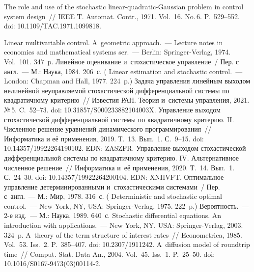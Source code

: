 \begin{multicols}{2}
{\small\frenchspacing
 { %
 \begin{thebibliography}{99}
       The role and use of the stochastic linear-quadratic-Gaussian problem in 
control system design~// IEEE T. Automat. Contr., 1971. Vol.~16. No.\,6. P.~529--552. doi: 
10.1109/TAC.1971.1099818.

 Linear multivariable control. A~geometric approach.~--- Lecture notes in 
economics and mathematical systems ser.~--- Berlin: Springer-Verlag, 1974. Vol.~101. 347~p.
 Линейное оценивание и~сто\-ха\-сти\-че\-ское управ\-ле\-ние~/ Пер. с англ.~--- 
М.: Наука, 1984. 206~с. ( Linear estimation and stochastic control.~--- 
London: Chapman and Hall, 1977. 224~p.)
 Задача управления линейным выходом нелинейной не\-управ\-ля\-емой 
стохастической дифференциальной сис\-те\-мы по квад\-ра\-тич\-но\-му критерию~// Известия 
РАН. Теория и~сис\-те\-мы управ\-ле\-ния, 2021. №\,5. C.~52--73. doi: 
10.31857/S000233882104003X.
 Управ\-ле\-ние выходом стохастической 
дифференциальной сис\-те\-мы по квад\-ра\-тич\-но\-му критерию. II. Численное решение 
уравнений динамического программирования~// Информатика и её применения, 2019. 
Т.~13. Вып.~1. С.~9--15. doi: 10.14357/19922264190102. EDN: ZASZFR.
 Управление выходом стохастической 
дифференциальной сис\-те\-мы по квад\-ра\-тич\-но\-му критерию. IV. Альтернативное численное 
решение~// Информатика и~её применения, 2020. Т.~14. Вып.~1. С.~24--30. doi: 
10.14357/19922264200104. EDN: XNHVFT.
 Оптимальное управление детерминированными 
и~стохастическими сис\-те\-ма\-ми~/ Пер. с~англ.~--- М.: Мир, 1978. 316~с. 
( Deterministic and stochastic optimal control.~--- New 
York, NY, USA: Springer-Verlag, 1975. 222~p.)
 Вероятность.~--- 2-е изд.~--- М.: Наука, 1989. 640~с.
 Stochastic differential equations. An introduction with 
applications.~--- New York, NY, USA: Springer-Verlag, 2003. 324~p.
       A~theory of the term structure of interest 
rates~// Econometrica, 1985. Vol.~53. Iss.~2. P.~385--407. doi: 10.2307/1911242.
       A~diffusion model of roundtrip time~// Comput. 
Stat. Data An., 2004. Vol.~45. Iss.~1. P.~25--50. doi:  
10.1016/S0167-9473(03)00114-2.

\end{thebibliography}

 }
 }

\end{multicols}

